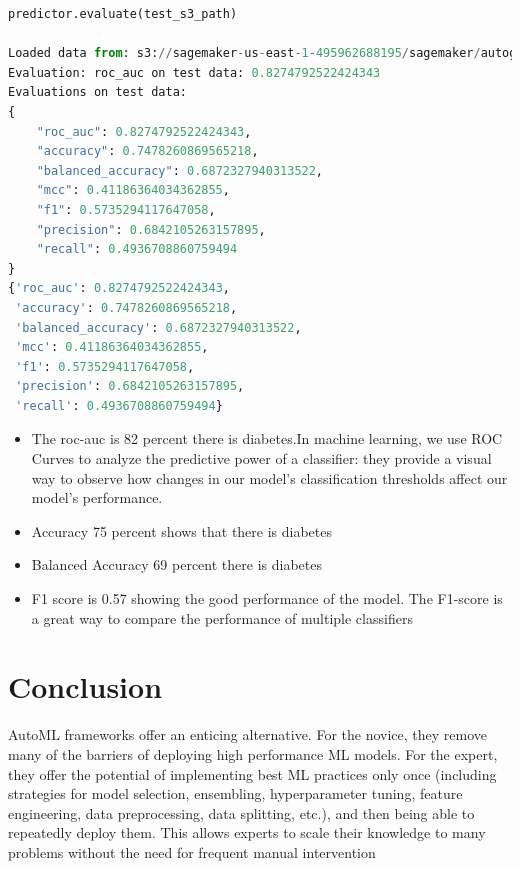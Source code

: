 \documentclass[
]{article}
\begin{document}
\begin{lstlisting}[language=python]
predictor.evaluate(test_s3_path)

Loaded data from: s3://sagemaker-us-east-1-495962688195/sagemaker/autogluon-tabular/data/test.csv | Columns = 9 / 9 | Rows = 230 -> 230
Evaluation: roc_auc on test data: 0.8274792522424343
Evaluations on test data:
{
    "roc_auc": 0.8274792522424343,
    "accuracy": 0.7478260869565218,
    "balanced_accuracy": 0.6872327940313522,
    "mcc": 0.41186364034362855,
    "f1": 0.5735294117647058,
    "precision": 0.6842105263157895,
    "recall": 0.4936708860759494
}
{'roc_auc': 0.8274792522424343,
 'accuracy': 0.7478260869565218,
 'balanced_accuracy': 0.6872327940313522,
 'mcc': 0.41186364034362855,
 'f1': 0.5735294117647058,
 'precision': 0.6842105263157895,
 'recall': 0.4936708860759494}
\end{lstlisting}

\begin{itemize}
\item
  The roc-auc is 82 percent there is diabetes.In machine learning, we
  use ROC Curves to analyze the predictive power of a classifier: they
  provide a visual way to observe how changes in our model's
  classification thresholds affect our model's performance.
\item
  Accuracy 75 percent shows that there is diabetes
\item
  Balanced Accuracy 69 percent there is diabetes
\item
  F1 score is 0.57 showing the good performance of the model. The
  F1-score is a great way to compare the performance of multiple
  classifiers
\end{itemize}

\hypertarget{conclusion}{%
\section{Conclusion}\label{conclusion}}

AutoML frameworks offer an enticing alternative. For the novice, they
remove many of the barriers of deploying high performance ML models. For
the expert, they offer the potential of implementing best ML practices
only once (including strategies for model selection, ensembling,
hyperparameter tuning, feature engineering, data preprocessing, data
splitting, etc.), and then being able to repeatedly deploy them. This
allows experts to scale their knowledge to many problems without the
need for frequent manual intervention
\end{document}
